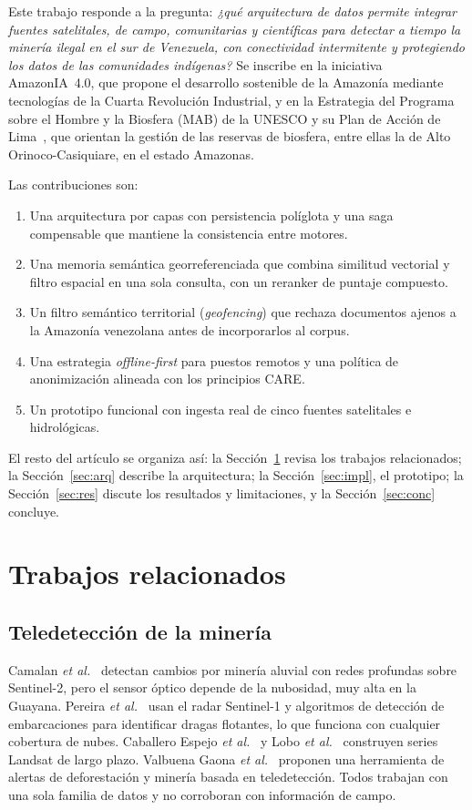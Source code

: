 \documentclass[conference]{IEEEtran}
\begin{document}
Este trabajo responde a la pregunta: \emph{¿qué arquitectura de datos permite integrar fuentes satelitales, de campo, comunitarias y científicas para detectar a tiempo la minería ilegal en el sur de Venezuela, con conectividad intermitente y protegiendo los datos de las comunidades indígenas?} Se inscribe en la iniciativa AmazonIA~4.0, que propone el desarrollo sostenible de la Amazonía mediante tecnologías de la Cuarta Revolución Industrial, y en la Estrategia del Programa sobre el Hombre y la Biosfera (MAB) de la UNESCO y su Plan de Acción de Lima~\cite{unesco2017}, que orientan la gestión de las reservas de biosfera, entre ellas la de Alto Orinoco-Casiquiare, en el estado Amazonas.

Las contribuciones son:
\begin{enumerate}
\item Una arquitectura por capas con persistencia políglota y una saga compensable que mantiene la consistencia entre motores.
\item Una memoria semántica georreferenciada que combina similitud vectorial y filtro espacial en una sola consulta, con un reranker de puntaje compuesto.
\item Un filtro semántico territorial (\emph{geofencing}) que rechaza documentos ajenos a la Amazonía venezolana antes de incorporarlos al corpus.
\item Una estrategia \emph{offline-first} para puestos remotos y una política de anonimización alineada con los principios CARE.
\item Un prototipo funcional con ingesta real de cinco fuentes satelitales e hidrológicas.
\end{enumerate}

El resto del artículo se organiza así: la Sección~\ref{sec:rel} revisa los trabajos relacionados; la Sección~\ref{sec:arq} describe la arquitectura; la Sección~\ref{sec:impl}, el prototipo; la Sección~\ref{sec:res} discute los resultados y limitaciones, y la Sección~\ref{sec:conc} concluye.

\section{Trabajos relacionados}\label{sec:rel}

\subsection{Teledetección de la minería}
Camalan \emph{et al.}~\cite{camalan2022} detectan cambios por minería aluvial con redes profundas sobre Sentinel-2, pero el sensor óptico depende de la nubosidad, muy alta en la Guayana. Pereira \emph{et al.}~\cite{pereira2024} usan el radar Sentinel-1 y algoritmos de detección de embarcaciones para identificar dragas flotantes, lo que funciona con cualquier cobertura de nubes. Caballero Espejo \emph{et al.}~\cite{caballero2018} y Lobo \emph{et al.}~\cite{lobo2015} construyen series Landsat de largo plazo. Valbuena Gaona \emph{et al.}~\cite{valbuena2024} proponen una herramienta de alertas de deforestación y minería basada en teledetección. Todos trabajan con una sola familia de datos y no corroboran con información de campo.
\end{document}

